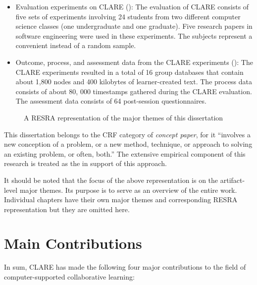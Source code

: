 \begin{itemize}
\item {\sf Evaluation experiments on CLARE ()\/}: The
  evaluation of CLARE consists of five sets of experiments involving 24
  students from two different computer science classes (one undergraduate
  and one graduate). Five research papers in software engineering were
  used in these experiments. The subjects represent a convenient instead
  of a random sample.
  
\item {\sf Outcome, process, and assessment data from the CLARE
  experiments ()\/}: The CLARE experiments resulted in
  a total of 16 group databases that contain about 1,800 nodes and 400
  kilobytes of learner-created text. The process data consists of about 80,
  000 timestamps gathered during the CLARE evaluation. The assessment data 
  consists of 64 post-session questionnaires.
\end{itemize}
\normalsize

\begin{figure}[hbtp]
 \caption{A RESRA representation of the major themes of this dissertation}
  \label{fig:resra-of-clare}
\end{figure}

This dissertation belongs to the CRF category of {\it concept paper\/}, for
it ``involves a new conception of a problem, or a new method, technique, or
approach to solving an existing problem, or often, both.'' The extensive
empirical component of this research is treated as the  in support of this approach.

It should be noted that the focus of the above representation is on the
artifact-level major themes. Its purpose is to serve as an overview of the
entire work. Individual chapters have their own major themes and
corresponding RESRA representation but they are omitted here.


\section{Main Contributions}
\label{sec:c8-contributions}

In sum, CLARE has made the following four major contributions to the field
of computer-supported collaborative learning:

